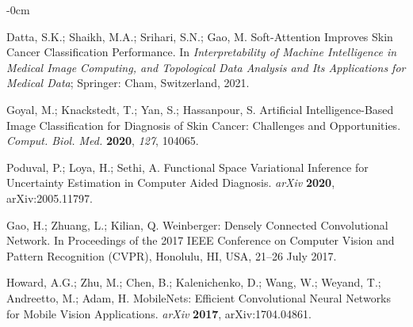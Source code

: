 \documentclass[sensors,article,accept,pdftex,moreauthors]{Definitions/mdpi}
\begin{document}
	\begin{adjustwidth}{-\extralength}{0cm}
		
		
		
		
		\begin{thebibliography}{999}

{Datta, S.K.; Shaikh, M.A.; Srihari, S.N.; Gao, M.}%
 Soft-Attention Improves Skin Cancer Classification Performance. In \emph{Interpretability of Machine Intelligence in Medical Image Computing, and Topological Data Analysis and Its Applications for Medical Data}; Springer: Cham, Switzerland, 
{2021}.

Goyal, M.; Knackstedt, T.; Yan, S.; Hassanpour, S.  Artificial Intelligence-Based Image Classification for Diagnosis of Skin Cancer: Challenges and Opportunities. 
{\em Comput. Biol. Med.} 
{\bf 2020}, \emph{127}, 104065.

Poduval, P.; Loya, H.; Sethi, A. Functional Space Variational Inference for Uncertainty Estimation in Computer Aided Diagnosis. 
{\em arXiv} 
{\bf 2020}, arXiv:2005.11797.

{Gao, H.; Zhuang, L.; Kilian, Q.  Weinberger: Densely Connected Convolutional Network.} In Proceedings of the 2017 {IEEE Conference on Computer Vision and Pattern Recognition (CVPR)}, Honolulu, HI, USA, 21--26 July 2017.

Howard, A.G.; Zhu, M.; Chen, B.; Kalenichenko, D.; Wang, W.;  Weyand, T.;  Andreetto, M.; Adam, H. MobileNets: Efficient Convolutional Neural Networks for Mobile Vision Applications.
{\em arXiv} 
{\bf 2017}, arXiv:1704.04861.


\end{thebibliography}
\end{adjustwidth}
\end{document}
